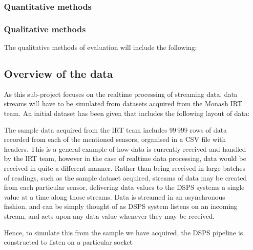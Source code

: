 \subsubsection{Quantitative methods} %
\label{ssub:quantitative_methods}





\subsubsection{Qualitative methods} %
\label{ssub:qualitative_methods}

The qualitative methods of evaluation will include the following:





\subsection{Overview of the data} %
\label{sub:overview_of_the_data}

As this sub-project focuses on the realtime processing of streaming data, data streams will have to be simulated from
datasets acquired from the Monash IRT team. An initial dataset has been given that includes the following layout of data:


The sample data acquired from the IRT team includes 99\,999 rows of data recorded from each of the mentioned sensors,
organised in a CSV file with headers. This is a general example of how data is currently received and handled by the IRT
team, however in the case of realtime data processing, data would be received in quite a different manner. Rather than
being received in large batches of readings, such as the sample dataset acquired, streams of data may be created from
each particular sensor, delivering data values to the DSPS systems a single value at a time along those streams. Data
is streamed in an asynchronous fashion, and can be simply thought of as DSPS system listens on an incoming stream, and
acts upon any data value whenever they may be received.

Hence, to simulate this from the sample we have acquired, the DSPS pipeline is constructed to listen on a particular
socket

